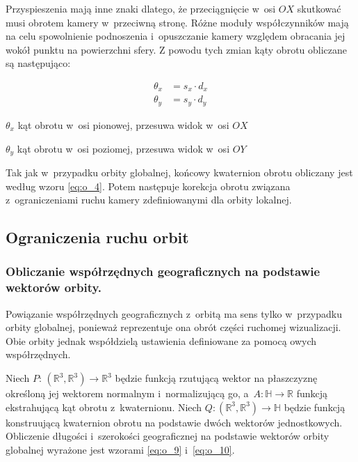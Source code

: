 Przyspieszenia mają inne znaki dlatego, że przeciągnięcie w~osi $OX$ skutkować musi obrotem kamery w~przeciwną stronę. Różne moduły współczynników mają na celu spowolnienie podnoszenia i~opuszczanie kamery względem obracania jej wokół punktu na powierzchni sfery. Z powodu tych zmian kąty obrotu obliczane są następująco:
\begin{samepage}
    \begin{align}
        \label{eq:o_8}
        \theta_x &= s_x \cdot d_x \\
        \theta_y &= s_y \cdot d_y
    \end{align}
    \begin{eqexpl}[25mm]
        \item {$\theta_x$} kąt obrotu w~osi pionowej, przesuwa widok w~osi $OX$
        \item {$\theta_y$} kąt obrotu w~osi poziomej, przesuwa widok w~osi $OY$
    \end{eqexpl}
    \vspace{\baselineskip}
\end{samepage}

Tak jak w~przypadku orbity globalnej, końcowy kwaternion obrotu obliczany jest według wzoru \ref{eq:o_4}. Potem następuje korekcja obrotu związana z~ograniczeniami ruchu kamery zdefiniowanymi dla orbity lokalnej.

\subsection{Ograniczenia ruchu orbit}

\subsubsection{Obliczanie współrzędnych geograficznych na podstawie wektorów orbity.}
Powiązanie współrzędnych geograficznych z~orbitą ma sens tylko w~przypadku orbity globalnej, ponieważ reprezentuje ona obrót części ruchomej wizualizacji. Obie orbity jednak współdzielą ustawienia definiowane za pomocą owych współrzędnych.

Niech $P:\,(\mathbb{R}^3, \mathbb{R}^3) \to \mathbb{R}^3$ będzie funkcją rzutującą wektor na płaszczyznę określoną jej wektorem normalnym i~normalizującą go, a~$A: \mathbb{H} \to \mathbb{R}$ funkcją ekstrahującą kąt obrotu z~kwaternionu. Niech $Q:(\mathbb{R}^3, \mathbb{R}^3) \to \mathbb{H}$ będzie funkcją konstruującą kwaternion obrotu na podstawie dwóch wektorów jednostkowych. Obliczenie długości i~szerokości geograficznej na podstawie wektorów orbity globalnej wyrażone jest wzorami \ref{eq:o_9} i~\ref{eq:o_10}.

